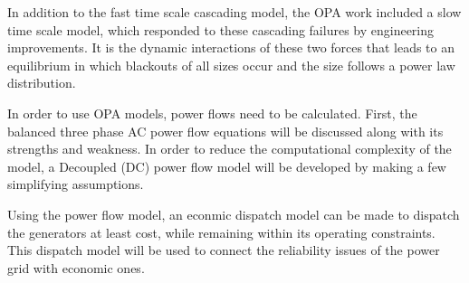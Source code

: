 In addition to the fast time scale cascading model, the OPA work included a slow time scale model, which responded to these cascading failures by engineering improvements.  It is the dynamic interactions of these two forces that leads to an equilibrium in which blackouts of all sizes occur and the size follows a power law distribution.

In order to use OPA models, power flows need to be calculated.  First, the balanced three phase AC power flow equations will be discussed along with its strengths and weakness.  In order to reduce the computational complexity of the model, a Decoupled (DC) power flow model will be developed by making a few simplifying assumptions.

Using the power flow model, an econmic dispatch model can be made to dispatch the generators at least cost, while remaining within its operating constraints.  This dispatch model will be used to connect the reliability issues of the power grid with economic ones.











